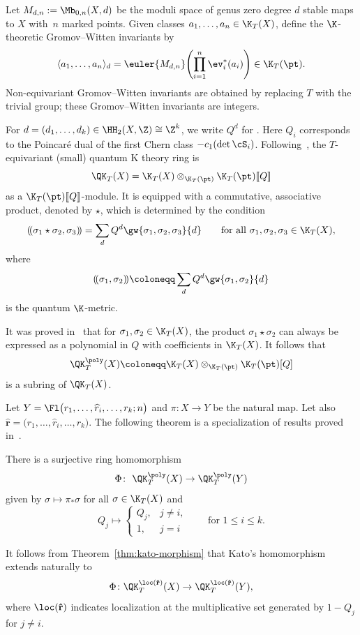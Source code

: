 Let $M_{d,n} := \Mb_{0,n}(X,d)$ be the moduli space of genus zero degree
$d$ stable maps to $X$ with~$n$ marked points. Given classes
$a_1, \dots, a_n \in \K_T(X)$,
define the $\K$-theoretic Gromov--Witten invariants by
\[ \langle a_1, \dots, a_n \rangle_{d} =
\euler{M_{d,n}}\Biggl(\prod_{i = 1}^n\ev_i^*(a_i)\Biggr)\in \K_T(\pt) . \]
Non-equivariant Gromov--Witten invariants are obtained by replacing $T$ with the
trivial group; these Gromov--Witten invariants are integers.

For $d=(d_1,\dots,d_k)\in\HH_2(X,\Z)\cong\Z^k$, we write $Q^d$ for . Here $Q_i$ corresponds to the Poincar{\'e} dual of the first Chern class $-c_1(\det \cS_i)$. Following~\cite{givental:onwdvv,lee:QK}, the $T$-equivariant (small) quantum
K theory ring is
\begin{equation*}%
\QK_T(X) = \K_T(X) \otimes_{\K_T(\pt)} \K_T(\pt)[\![Q]\!]
\end{equation*}
as a $\K_T(\pt)[\![Q]\!]$-module.
It is equipped with a commutative, associative
product, denoted by $\star$, which is
determined by the condition
\begin{equation*}%
 (\!(\sigma_1\star\sigma_2,\sigma_3)\!)=\sum_d
 Q^d \gw{\sigma_1,\sigma_2,\sigma_3}{d}\qquad\text{for all $\sigma_1,\sigma_2,\sigma_3\in \K_T(X)$},
\end{equation*}
where
\[
 (\!(\sigma_1,\sigma_2)\!)\coloneqq \sum_{d}Q^d \gw{\sigma_1,\sigma_2}{d}
\]
is the quantum $\K$-metric.

It was proved in~\cite{anderson2022finite, kato:loop} that for $\sigma_1,\sigma_2\in\K_T(X)$, the product $\sigma_1\star\sigma_2$ can always be expressed as a polynomial in $Q$ with coefficients in $\K_T(X)$. It follows that
\[
 \QK_T^\poly(X)\coloneqq\K_T(X) \otimes_{\K_T(\pt)}\K_T(\pt)[Q]
\]
is a subring of $\QK_T(X)$.

Let $Y=\Fl\bigl(r_1,\dots, \widehat{r}_i,\dots, r_k;n\bigr)$ and $\pi\colon X\to Y$ be the natural map. Let also $\widehat{\mathbf{r}} = \bigl(r_1, \dots,\allowbreak \widehat{r}_i,\dots, r_k\bigr)$. The following theorem is a specialization of results proved in~\cite{kato2019quantum}.

\begin{Theorem}[Kato]\label{thm:kato-morphism}
 There is a surjective ring homomorphism
 \[
 \Phi\colon\ \QK^\poly_T(X)\to\QK^\poly_T(Y)
 \]
 given by $\sigma\mapsto{\pi}_*\sigma$ for all $\sigma\in\K_T(X)$ and
 \[
 Q_j\mapsto\begin{cases}
 Q_j, & j\neq i,\\
 1, & j=i
 \end{cases} \qquad \text{for $1\leq i\leq k$}.\]
\end{Theorem}
It follows from Theorem~\ref{thm:kato-morphism} that
Kato's homomorphism extends naturally to
\begin{equation}\label{E:Kato-loc-hom}
\Phi\colon \QK_T^{\loc(\mathbf{\hat r})}(X) \to
\QK_T^{\loc(\mathbf{\hat r})}(Y) ,
\end{equation}
where $\loc(\mathbf{\hat r})$ indicates localization at the multiplicative set generated by
$1- Q_j$ for $j \neq i$.

